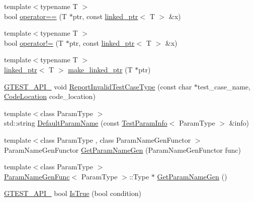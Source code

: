 \begin{DoxyCompactItemize}
\item 
{\footnotesize template$<$typename T $>$ }\\bool \mbox{\hyperlink{namespacetesting_1_1internal_ad1cb54a206a209ddace17a05359d38ae}{operator==}} (T $\ast$ptr, const \mbox{\hyperlink{classtesting_1_1internal_1_1linked__ptr}{linked\+\_\+ptr}}$<$ T $>$ \&x)
\item 
{\footnotesize template$<$typename T $>$ }\\bool \mbox{\hyperlink{namespacetesting_1_1internal_a6910869259f8f31825b471e9190fa09a}{operator!=}} (T $\ast$ptr, const \mbox{\hyperlink{classtesting_1_1internal_1_1linked__ptr}{linked\+\_\+ptr}}$<$ T $>$ \&x)
\item 
{\footnotesize template$<$typename T $>$ }\\\mbox{\hyperlink{classtesting_1_1internal_1_1linked__ptr}{linked\+\_\+ptr}}$<$ T $>$ \mbox{\hyperlink{namespacetesting_1_1internal_a0d79fad1f772844eff35dfe955f24fd6}{make\+\_\+linked\+\_\+ptr}} (T $\ast$ptr)
\item 
\mbox{\hyperlink{gtest-port_8h_aa73be6f0ba4a7456180a94904ce17790}{G\+T\+E\+S\+T\+\_\+\+A\+P\+I\+\_\+}} void \mbox{\hyperlink{namespacetesting_1_1internal_ab7e343160ee0aca7c8ae7c025a372453}{Report\+Invalid\+Test\+Case\+Type}} (const char $\ast$test\+\_\+case\+\_\+name, \mbox{\hyperlink{structtesting_1_1internal_1_1CodeLocation}{Code\+Location}} code\+\_\+location)
\item 
{\footnotesize template$<$class Param\+Type $>$ }\\std\+::string \mbox{\hyperlink{namespacetesting_1_1internal_a954ec4a8a932dac7743e77e459ffefdc}{Default\+Param\+Name}} (const \mbox{\hyperlink{structtesting_1_1TestParamInfo}{Test\+Param\+Info}}$<$ Param\+Type $>$ \&info)
\item 
{\footnotesize template$<$class Param\+Type , class Param\+Name\+Gen\+Functor $>$ }\\Param\+Name\+Gen\+Functor \mbox{\hyperlink{namespacetesting_1_1internal_abc0f0626877188afba6ad122d502f088}{Get\+Param\+Name\+Gen}} (Param\+Name\+Gen\+Functor func)
\item 
{\footnotesize template$<$class Param\+Type $>$ }\\\mbox{\hyperlink{structtesting_1_1internal_1_1ParamNameGenFunc}{Param\+Name\+Gen\+Func}}$<$ Param\+Type $>$\+::Type $\ast$ \mbox{\hyperlink{namespacetesting_1_1internal_a27d6ea7d401e877cb0fbddf4206ebbe4}{Get\+Param\+Name\+Gen}} ()
\item 
\mbox{\hyperlink{gtest-port_8h_aa73be6f0ba4a7456180a94904ce17790}{G\+T\+E\+S\+T\+\_\+\+A\+P\+I\+\_\+}} bool \mbox{\hyperlink{namespacetesting_1_1internal_a527b9bcc13669b9a16400c8514266254}{Is\+True}} (bool condition)

\end{DoxyCompactItemize}
